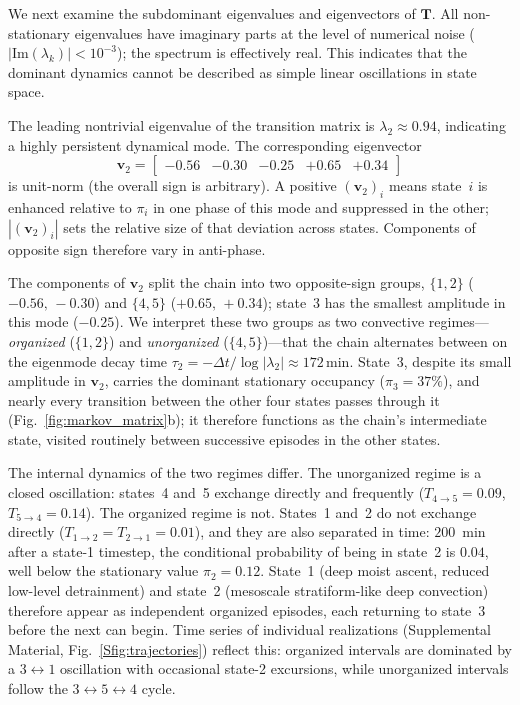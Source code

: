 \documentclass[
    aps,
    prl,
    reprint,
    superscriptaddress,
    amsmath,amssymb,
    floatfix,
    nofootinbib
]{revtex4-2}
\begin{document}
We next examine the subdominant eigenvalues and eigenvectors of $\mathbf{T}$. All non-stationary eigenvalues have imaginary parts at the level of numerical noise ($|\mathrm{Im}(\lambda_k)|<10^{-3}$); the spectrum is effectively real. This indicates that the dominant dynamics cannot be described as simple linear oscillations in state space.

The leading nontrivial eigenvalue of the transition matrix is $\lambda_2 \approx 0.94$, indicating a highly persistent dynamical mode. The corresponding eigenvector
\begin{equation}
\mathbf{v}_2 =
\begin{bmatrix}
-0.56 & -0.30 & -0.25 & +0.65 & +0.34
\end{bmatrix}
\end{equation}
is unit-norm (the overall sign is arbitrary). A positive $(\mathbf{v}_2)_i$ means state~$i$ is enhanced relative to $\pi_i$ in one phase of this mode and suppressed in the other; $|(\mathbf{v}_2)_i|$ sets the relative size of that deviation across states. Components of opposite sign therefore vary in anti-phase.

The components of $\mathbf{v}_2$ split the chain into two opposite-sign groups, $\{1,2\}$ ($-0.56,\,-0.30$) and $\{4,5\}$ ($+0.65,\,+0.34$); state~3 has the smallest amplitude in this mode ($-0.25$). We interpret these two groups as two convective regimes---\emph{organized} ($\{1,2\}$) and \emph{unorganized} ($\{4,5\}$)---that the chain alternates between on the eigenmode decay time $\tau_2 = -\Delta t / \log|\lambda_2| \approx 172\,\mathrm{min}$. State~3, despite its small amplitude in $\mathbf{v}_2$, carries the dominant stationary occupancy ($\pi_3=37\%$), and nearly every transition between the other four states passes through it (Fig.~\ref{fig:markov_matrix}b); it therefore functions as the chain's intermediate state, visited routinely between successive episodes in the other states.

The internal dynamics of the two regimes differ. The unorganized regime is a closed oscillation: states~4 and~5 exchange directly and frequently ($T_{4\to 5}=0.09$, $T_{5\to 4}=0.14$). The organized regime is not. States~1 and~2 do not exchange directly ($T_{1\to 2}=T_{2\to 1}=0.01$), and they are also separated in time: $200$~min after a state-1 timestep, the conditional probability of being in state~2 is $0.04$, well below the stationary value $\pi_2=0.12$. State~1 (deep moist ascent, reduced low-level detrainment) and state~2 (mesoscale stratiform-like deep convection) therefore appear as independent organized episodes, each returning to state~3 before the next can begin. Time series of individual realizations (Supplemental Material, Fig.~\ref{Sfig:trajectories}) reflect this: organized intervals are dominated by a $3\!\leftrightarrow\!1$ oscillation with occasional state-2 excursions, while unorganized intervals follow the $3\!\leftrightarrow\!5\!\leftrightarrow\!4$ cycle.
\end{document}
